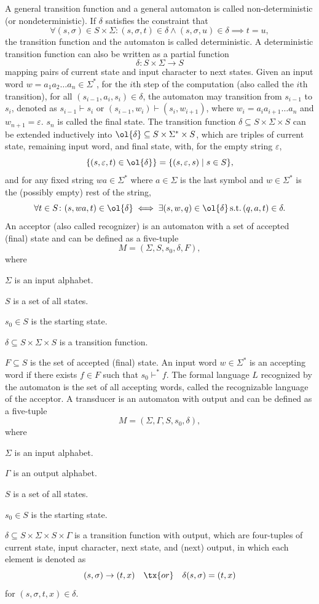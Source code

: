 \documentclass[a4paper,12pt]{article}
\begin{document}
A general transition function and a general automaton is called non-deterministic (or nondeterministic). If $\delta$ satisfies the constraint that
\[\forall (s,\sigma)\in S\times\Sigma\colon(s,\sigma,t)\in\delta\land(s,\sigma,u)\in\delta\implies t=u,\]
the transition function and the automaton is called deterministic. A deterministic transition function can also be written as a partial function
\[\delta\colon S\times\Sigma\to S\]
mapping pairs of current state and input character to next states.
\eit
Given an input word $w=a_1a_2\ldots a_n\in\Sigma^*$, for the $i$th step of the computation (also called the $i$th transition), for all $(s_{i-1},a_i,s_i)\in\delta$, the automaton may transition from $s_{i-1}$ to $s_i$, denoted as $s_{i-1}\vdash s_i$ or $(s_{i-1},w_i)\vdash (s_i,w_{i+1})$, where $w_i=a_ia_{i+1}\ldots a_n$ and $w_{n+1}=\varepsilon$. $s_n$ is called the final state.
The transition function $\delta\subseteq S\times\Sigma\times S$ can be extended inductively into $\ol{\delta}\subseteq S\times\Sigma^*\times S$, which are triples of current state, remaining input word, and final state, with, for the empty string $\varepsilon$,
\[\{(s,\varepsilon,t)\in\ol{\delta}\}=\{(s,\varepsilon,s)\mid s\in S\},\]
and for any fixed string $wa\in\Sigma^*$ where $a\in\Sigma$ is the last symbol and $w\in\Sigma^*$ is the (possibly empty) rest of the string,
\[\forall t\in S\colon(s,wa,t)\in\ol{\delta}\iff\exists (s,w,q)\in\ol{\delta}\,\text{s.t.}\,(q,a,t)\in\delta.\]
An acceptor (also called recognizer) is an automaton with a set of accepted (final) state and can be defined as a five-tuple
\[M=(\Sigma,S,s_0,\delta,F),\]
where
\bit
\item $\Sigma$ is an input alphabet.
\item $S$ is a set of all states.
\item $s_0\in S$ is the starting state.
\item $\delta\subseteq S\times\Sigma\times S$ is a transition function.
\item $F\subseteq S$ is the set of accepted (final) state.
\eit
An input word $w\in\Sigma^*$ is an accepting word if there exists $f\in F$ such that $s_0\vdash^*f$. The formal language $L$ recognized by the automaton is the set of all accepting words, called the recognizable language of the acceptor.
A transducer is an automaton with output and can be defined as a five-tuple
\[M=(\Sigma,\Gamma,S,s_0,\delta),\]
where
\bit
\item $\Sigma$ is an input alphabet.
\item $\Gamma$ is an output alphabet.
\item $S$ is a set of all states.
\item $s_0\in S$ is the starting state.
\item $\delta\subseteq S\times\Sigma\times S\times\Gamma$ is a transition function with output, which are four-tuples of current state, input character, next state, and (next) output, in which each element is denoted as
\[(s,\sigma)\to (t,x)\quad\tx{or}\quad\delta(s,\sigma)=(t,x)\]
for $(s,\sigma,t,x)\in\delta$.
\end{document}
